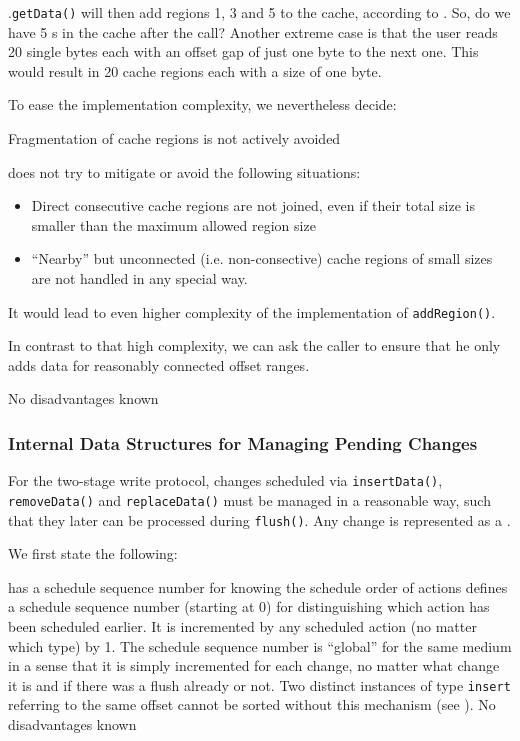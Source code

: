 \IMediumStore{}.\texttt{getData()} will then add regions 1, 3 and 5 to the cache, according to . So, do we have 5 \MediumRegion{}s in the cache after the call? Another extreme case is that the user reads 20 single bytes each with an offset gap of just one byte to the next one. This would result in 20 cache regions each with a size of one byte.

To ease the implementation complexity, we nevertheless decide:

{%
Fragmentation of cache regions is not actively avoided
}
{%
\COMPmedia{} does not try to mitigate or avoid the following situations:
\begin{itemize}
\item Direct consecutive cache regions are not joined, even if their total size is smaller than the maximum allowed region size
\item ``Nearby'' but unconnected (i.e. non-consective) cache regions of small sizes are not handled in any special way.
\end{itemize}
}
{%
It would lead to even higher complexity of the implementation of \texttt{addRegion()}.

In contrast to that high complexity, we can ask the caller to ensure that he only adds data for reasonably connected offset ranges.
}
{%
No disadvantages known
}


\subsubsection{Internal Data Structures for Managing Pending Changes}
\label{sec:DatenstrukturenZweist}

For the two-stage write protocol, changes scheduled via \texttt{insertData()}, \texttt{removeData()} and \texttt{replaceData()} must be managed in a reasonable way, such that they later can be processed during \texttt{flush()}. Any change is represented as a \MediumAction{}.

We first state the following:

{%
\MediumAction{} has a schedule sequence number for knowing the schedule order of actions
}
{%
\MediumAction{} defines a schedule sequence number (starting at 0) for distinguishing which action has been scheduled earlier. It is incremented by any scheduled action (no matter which type) by 1. The schedule sequence number is ``global'' for the same medium in a sense that it is simply incremented for each change, no matter what change it is and if there was a flush already or not.
}
{%
Two distinct \MediumAction{} instances of type \texttt{insert} referring to the same offset cannot be sorted without this mechanism (see ).
}
{%
No disadvantages known
}

